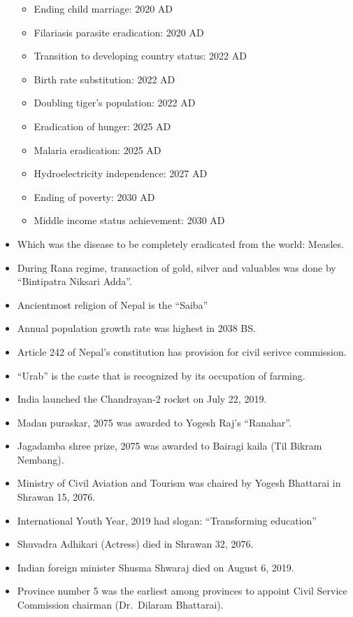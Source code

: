 \documentclass[
]{book}
\providecommand{\tightlist}{%
  \setlength{\itemsep}{0pt}\setlength{\parskip}{0pt}}
\begin{document}
\begin{itemize}
  \begin{itemize}
  \tightlist
  \item
    Ending child marriage: 2020 AD
  \item
    Filariasis parasite eradication: 2020 AD
  \item
    Transition to developing country status: 2022 AD
  \item
    Birth rate substitution: 2022 AD
  \item
    Doubling tiger's population: 2022 AD
  \item
    Eradication of hunger: 2025 AD
  \item
    Malaria eradication: 2025 AD
  \item
    Hydroelectricity independence: 2027 AD
  \item
    Ending of poverty: 2030 AD
  \item
    Middle income status achievement: 2030 AD
  \end{itemize}
\item
  Which was the disease to be completely eradicated from the world: Measles.
\item
  During Rana regime, transaction of gold, silver and valuables was done by ``Bintipatra Niksari Adda''.
\item
  Ancientmost religion of Nepal is the ``Saiba''
\item
  Annual population growth rate was highest in 2038 BS.
\item
  Article 242 of Nepal's constitution has provision for civil serivce commission.
\item
  ``Urab'' is the caste that is recognized by its occupation of farming.
\item
  India launched the Chandrayan-2 rocket on July 22, 2019.
\item
  Madan puraskar, 2075 was awarded to Yogesh Raj's ``Ranahar''.
\item
  Jagadamba shree prize, 2075 was awarded to Bairagi kaila (Til Bikram Nembang).
\item
  Ministry of Civil Aviation and Tourism was chaired by Yogesh Bhattarai in Shrawan 15, 2076.
\item
  International Youth Year, 2019 had slogan: ``Transforming education''
\item
  Shuvadra Adhikari (Actress) died in Shrawan 32, 2076.
\item
  Indian foreign minister Shusma Shwaraj died on August 6, 2019.
\item
  Province number 5 was the earliest among provinces to appoint Civil Service Commission chairman (Dr.~Dilaram Bhattarai).

\end{itemize}
\end{document}
